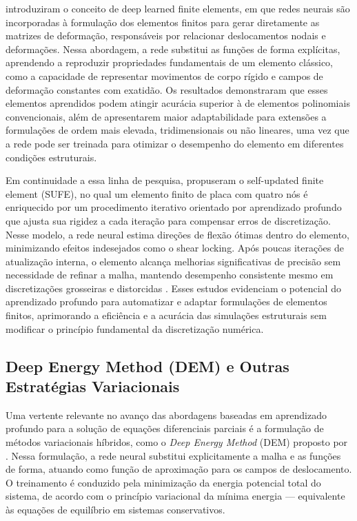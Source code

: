 \documentclass[12pt,openright,oneside,a4paper,english,brazil]{abntex2}
\begin{document}
\textcite{jung2020} introduziram o conceito de deep learned finite elements, em que redes neurais são incorporadas à formulação dos elementos finitos para gerar diretamente as matrizes de deformação, responsáveis por relacionar deslocamentos nodais e deformações. Nessa abordagem, a rede substitui as funções de forma explícitas, aprendendo a reproduzir propriedades fundamentais de um 
elemento clássico, como a capacidade de representar movimentos de corpo rígido e campos de deformação constantes com exatidão. Os resultados demonstraram que esses elementos aprendidos podem atingir acurácia superior à de elementos polinomiais convencionais, além de apresentarem maior adaptabilidade para extensões a formulações de ordem mais elevada, tridimensionais ou não lineares, uma 
vez que a rede pode ser treinada para otimizar o desempenho do elemento em diferentes condições estruturais.

Em continuidade a essa linha de pesquisa, \textcite{jung2022} propuseram o self-updated finite element (SUFE), no qual um elemento finito de placa com quatro nós é enriquecido por um procedimento iterativo orientado por aprendizado profundo que ajusta sua rigidez a cada iteração para compensar erros de discretização. Nesse modelo, a rede neural estima direções de flexão ótimas dentro do 
elemento, minimizando efeitos indesejados como o shear locking. Após poucas iterações de atualização interna, o elemento alcança melhorias significativas de precisão sem necessidade de refinar a malha, mantendo desempenho consistente mesmo em discretizações grosseiras e distorcidas \cite{jung2022}. Esses estudos evidenciam o potencial do aprendizado profundo para automatizar e adaptar 
formulações de elementos finitos, aprimorando a eficiência e a acurácia das simulações estruturais sem modificar o princípio fundamental da discretização numérica.

\subsection{Deep Energy Method (DEM) e Outras Estratégias Variacionais}

Uma vertente relevante no avanço das abordagens baseadas em aprendizado profundo para a solução de equações diferenciais parciais é a formulação de métodos variacionais híbridos, como o \textit{Deep Energy Method} (DEM) proposto por \textcite{samaniego2020}. Nessa formulação, a rede neural substitui explicitamente a malha e as funções de forma, atuando como função de aproximação para os 
campos de deslocamento. O treinamento é conduzido pela minimização da energia potencial total do sistema, de acordo com o princípio variacional da mínima energia — equivalente às equações de equilíbrio em sistemas conservativos.
\end{document}
